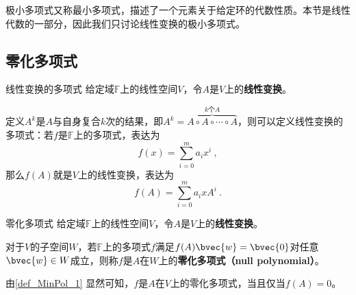 



极小多项式又称最小多项式，描述了一个元素关于给定环的代数性质。本节是线性代数的一部分，因此我们只讨论线性变换的极小多项式。


\subsection{零化多项式}





\begin{definition}{线性变换的多项式}
给定域$\mathbb{F}$上的线性空间$V$，令$A$是$V$上的\textbf{线性变换}。

定义$A^k$是$A$与自身复合$k$次的结果，即$A^k=\overbrace{A\circ A\circ\cdots\circ A}^{k\text{个}A}$，则可以定义线性变换的多项式：若$f$是$\mathbb{F}$上的多项式，表达为
\begin{equation}
f(x) = \sum_{i=0}^m a_ix^i~, 
\end{equation}
那么$f(A)$就是$V$上的线性变换，表达为
\begin{equation}
f(A) = \sum_{i=0}^m a_ixA^i~. 
\end{equation}
\end{definition}



\begin{definition}{零化多项式}\label{def_MinPol_1}
给定域$\mathbb{F}$上的线性空间$V$，令$A$是$V$上的\textbf{线性变换}。

对于$V$的子空间$W$，若$\mathbb{F}$上的多项式$f$满足$f(A)\bvec{w}=\bvec{0}$对任意$\bvec{w}\in W$成立，则称$f$是$A$在$W$上的\textbf{零化多项式（null polynomial）}。
\end{definition}


由\autoref{def_MinPol_1} 显然可知，$f$是$A$在$V$上的零化多项式，当且仅当$f(A)=0$。























